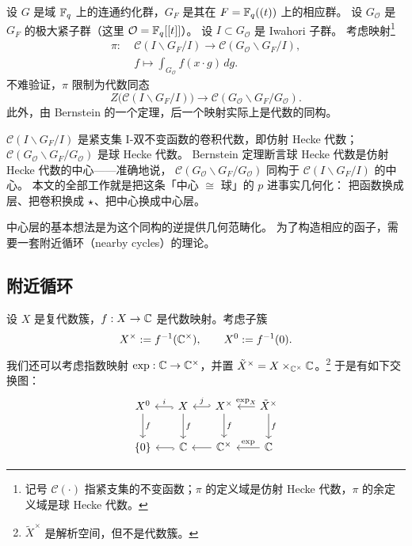 设 $G$ 是域 $\mathbb{F}_q$ 上的连通约化群，$G_F$ 是其在 $F=\mathbb{F}_q((t))$ 上的相应群。
设 $G_{\mathcal{O}}$ 是 $G_F$ 的极大紧子群（这里 $\mathcal{O}=\mathbb{F}_q[[t]]$）。
设 $I\subset G_{\mathcal{O}}$ 是 Iwahori 子群。
考虑映射\footnote{记号 $\mathcal{C}(\cdot)$ 指紧支集的不变函数；$\pi$ 的定义域是仿射 Hecke 代数，$\pi$ 的余定义域是球 Hecke 代数。}
\begin{align*}
\pi:\;&\mathcal{C}(I\backslash G_F/I)\longrightarrow \mathcal{C}(G_{\mathcal{O}}\backslash G_F/I),\\
     &f\longmapsto \int_{G_{\mathcal{O}}} f(x\cdot g)\,dg .
\end{align*}
不难验证，$\pi$ 限制为代数同态
\[
Z\bigl(\mathcal{C}(I\backslash G_F/I)\bigr)\longrightarrow \mathcal{C}(G_{\mathcal{O}}\backslash G_F/G_{\mathcal{O}}).
\]
此外，由 Bernstein 的一个定理，后一个映射实际上是代数的同构。

\begin{yizhu}
$\mathcal{C}(I\backslash G_F/I)$ 是紧支集 I-双不变函数的卷积代数，即仿射 Hecke 代数；
$\mathcal{C}(G_{\mathcal{O}}\backslash G_F/G_{\mathcal{O}})$ 是球 Hecke 代数。
Bernstein 定理断言球 Hecke 代数是仿射 Hecke 代数的中心——准确地说，
$\mathcal{C}(G_{\mathcal{O}}\backslash G_F/G_{\mathcal{O}})$ 同构于
$\mathcal{C}(I\backslash G_F/I)$ 的中心。
本文的全部工作就是把这条「中心 $\cong$ 球」的 $p$ 进事实几何化：
把函数换成层、把卷积换成 $\star$、把中心换成中心层。
\end{yizhu}

中心层的基本想法是为这个同构的逆提供几何范畴化。
为了构造相应的函子，需要一套附近循环（nearby cycles）的理论。

\subsection{附近循环}\label{sec:nearby}

设 $X$ 是复代数簇，$f:X\to\mathbb{C}$ 是代数映射。考虑子簇
\[
X^{\times}:=f^{-1}(\mathbb{C}^{\times}),\qquad X^{0}:=f^{-1}(0).
\]
我们还可以考虑指数映射 $\exp:\mathbb{C}\to\mathbb{C}^{\times}$，并置
$\tilde X^{\times}=X\times_{\mathbb{C}^{\times}}\mathbb{C}$。\footnote{$\tilde X^{\times}$ 是解析空间，但不是代数簇。}
于是有如下交换图：
\begin{equation}
\begin{tikzcd}[column sep=1.6em, row sep=2.2em]
X^{0} \arrow[d,"f"] & X \arrow[l,hook,"i"'] \arrow[d,"f"]
  & X^{\times} \arrow[l,hook',"j"'] \arrow[d,"f"]
  & \tilde X^{\times} \arrow[l,"\exp_X"'] \arrow[d,"f"] \\
\{0\} & \bbC \arrow[l,hook,""'] & \bbC^{\times} \arrow[l,""']
  & \bbC \arrow[l,"\exp"']
\end{tikzcd}
\end{equation}

